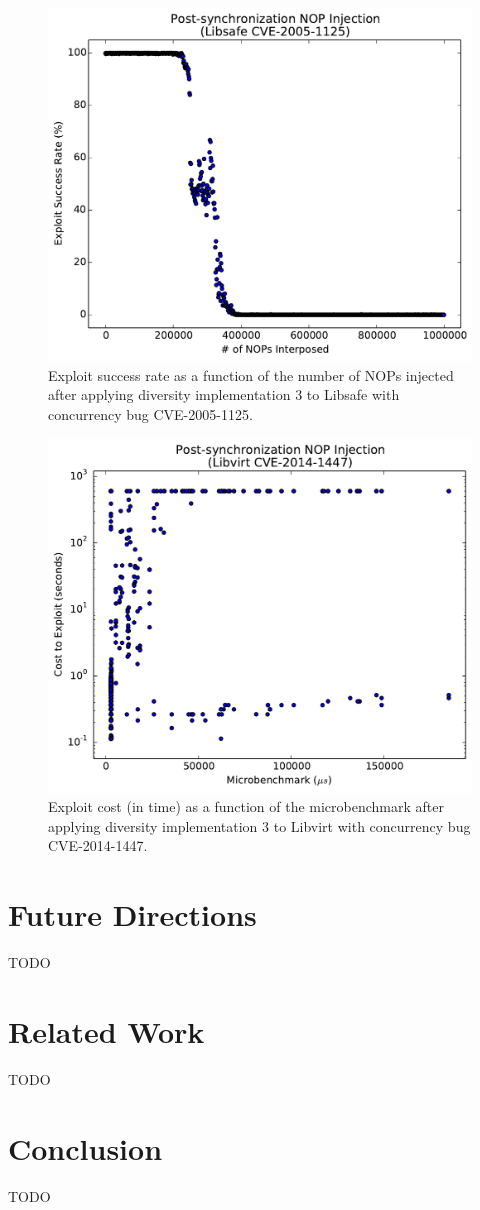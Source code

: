 \documentclass[letterpaper,twocolumn,10pt]{article}
\begin{document}
\begin{figure}
\centering
\includegraphics[width=\columnwidth]{figures/libsafe-post}
\caption{Exploit success rate as a function of the number of NOPs injected after applying diversity implementation 3 to Libsafe with concurrency bug CVE-2005-1125.}
\label{fig_libsafe-post}
\end{figure}

\begin{figure}
\centering
\includegraphics[width=\columnwidth]{figures/libvirt-post}
\caption{Exploit cost (in time) as a function of the microbenchmark after applying diversity implementation 3 to Libvirt with concurrency bug CVE-2014-1447.}
\label{fig_libvirt-post}
\end{figure}

\section{Future Directions}
TODO

\section{Related Work}
TODO

\section{Conclusion}
TODO

{\footnotesize 
}
\end{document}

